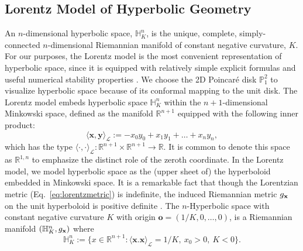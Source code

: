 \subsection{Lorentz Model of Hyperbolic Geometry}
An $n$-dimensional hyperbolic space, $\mathbb{H}^n_K$, is the unique, complete, simply-connected $n$-dimensional Riemannian manifold of constant negative curvature, $K$.  For our purposes, the Lorentz model is the most convenient representation of hyperbolic space, since it is equipped with relatively simple explicit formulas and useful numerical stability properties \cite{nickel2018learning}. We choose the 2D Poincar\'e disk $\mathbb{P}^2_1$ to visualize hyperbolic space because of its conformal mapping to the unit disk. The Lorentz model embeds hyperbolic space $\mathbb{H}^n_K$ within the $n+1$-dimensional Minkowski space, defined as the manifold $\mathbb{R}^{n+1}$ equipped with the following inner product:
\begin{equation}\label{eq:lorentzmetric}
    \langle \textbf{x}, \textbf{y} \rangle_{\mathcal{L}} := -x_0y_0 + x_1y_1 + \dots + x_ny_n,
\end{equation}
which has the type 
$\langle \cdot, \cdot \rangle_{\mathcal{L}}: \mathbb{R}^{n+1} \times \mathbb{R}^{n+1} \to \mathbb{R}$.
It is common to denote this space as $\mathbb{R}^{1,n}$ to emphasize the distinct role of the zeroth coordinate.
In the Lorentz model, we model hyperbolic space as the (upper sheet of) the hyperboloid embedded in Minkowski space. It is a remarkable fact that though the Lorentzian metric (Eq.~\ref{eq:lorentzmetric}) is indefinite,
the induced Riemannian metric $g_{\mathbf{x}}$ on the unit hyperboloid is positive definite \cite{Ratcliffe94}. The $n$-Hyperbolic space with constant negative curvature $K$ with origin $\textbf{o} = (1/K, 0, \dots, 0)$, is a Riemannian manifold $(\mathbb{H}^{n}_K,g_{\mathbf{x}})$ where
\begin{equation*}
    \mathbb{H}^{n}_K := \{x \in \mathbb{R}^{n+1}:  \langle \textbf{x}. \textbf{x} \rangle_{\mathcal{L}} = 1/K, \ x_0 > 0, \ K<0 \}.
\end{equation*}


